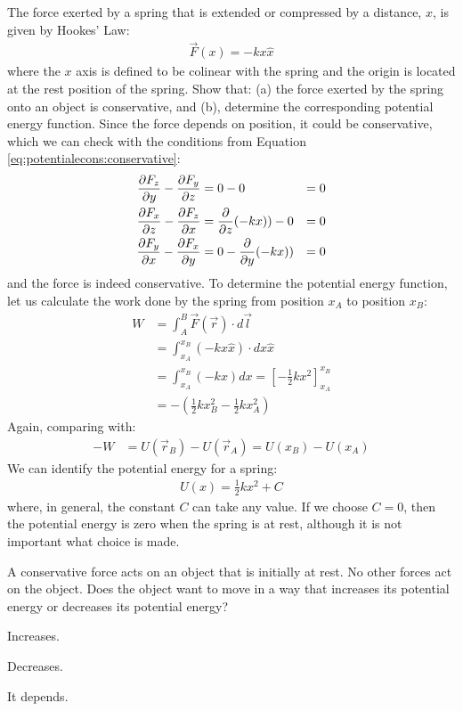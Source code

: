 \begin{example}{\label{ex:potentialecons:springpotential}The force exerted by a spring that is extended or compressed by a distance, $x$, is given by Hookes' Law:
\begin{align*}
\vec F(x) = -k x\hat x
\end{align*}
where the $x$ axis is defined to be colinear with the spring and the origin is located at the rest position of the spring. Show that: (a) the force exerted by the spring onto an object is conservative, and (b), determine the corresponding potential energy function. }
Since the force depends on position, it could be conservative, which we can check with the conditions from Equation \ref{eq:potentialecons:conservative}:
\begin{align*}
\frac{\partial F_z}{\partial y}-\frac{\partial F_y}{\partial z} &= 0 - 0 &= 0\\
\frac{\partial F_x}{\partial z}-\frac{\partial F_z}{\partial x} &= \frac{\partial }{\partial z}(-kx)) - 0&= 0\\
\frac{\partial F_y}{\partial x}-\frac{\partial F_x}{\partial y} &= 0 - \frac{\partial }{\partial y}(-kx)) &=0
\end{align*}
and the force is indeed conservative. To determine the potential energy function, let us calculate the work done by the spring from position $x_A$ to position $x_B$:
\begin{align*}
W &=\int_A^B \vec F(\vec r) \cdot d\vec l\\
&=\int_{x_A}^{x_B} (-kx\hat x) \cdot dx \hat x\\
&=\int_{x_A}^{x_B} (-kx)dx=\left[-\frac{1}{2}kx^2  \right]_{x_A}^{x_B}\\
&=-\left( \frac{1}{2}kx_B^2-\frac{1}{2}kx_A^2 \right)
\end{align*}
Again, comparing with:
\begin{align*}
-W &= U(\vec r_B) - U(\vec r_A) = U(x_B) - U(x_A)
\end{align*}
We can identify the potential energy for a spring:
\begin{align*}
U(x) = \frac{1}{2}kx^2 + C
\end{align*}
where, in general, the constant $C$ can take any value. If we choose $C=0$, then the potential energy is zero when the spring is at rest, although it is not important what choice is made.
\end{example}

\begin{checkpoint}
\begin{MCquestion}{A conservative force acts on an object that is initially at rest. No other forces act on the object. Does the object want to move in a way that increases its potential energy or decreases its potential energy?}
\item Increases.
\item Decreases. \correct
\item It depends.
\end{MCquestion}
\end{checkpoint}

